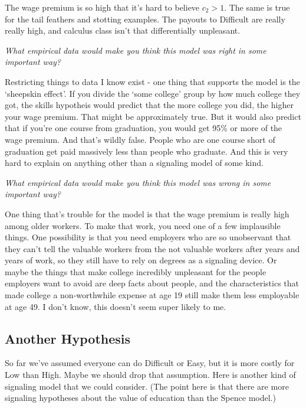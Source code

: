 \documentclass[
  11pt,
]{article}
\begin{document}
The wage premium is so high that it's hard to believe \(c_2 > 1\). The
same is true for the tail feathers and stotting examples. The payouts to
Difficult are really really high, and calculus class isn't that
differentially unpleasant.

\emph{What empirical data would make you think this model was right in
some important way?}

Restricting things to data I know exist - one thing that supports the
model is the `sheepskin effect'. If you divide the `some college' group
by how much college they got, the skills hypotheis would predict that
the more college you did, the higher your wage premium. That might be
approximately true. But it would also predict that if you're one course
from graduation, you would get 95\% or more of the wage premium. And
that's wildly false. People who are one course short of graduation get
paid massively less than people who graduate. And this is very hard to
explain on anything other than a signaling model of some kind.

\emph{What empirical data would make you think this model was wrong in
some important way?}

One thing that's trouble for the model is that the wage premium is
really high among older workers. To make that work, you need one of a
few implausible things. One possibility is that you need employers who
are so unobservant that they can't tell the valuable workers from the
not valuable workers after years and years of work, so they still have
to rely on degrees as a signaling device. Or maybe the things that make
college incredibly unpleasant for the people employers want to avoid are
deep facts about people, and the characteristics that made college a
non-worthwhile expense at age 19 still make them less employable at age
49. I don't know, this doesn't seem super likely to me.

\hypertarget{another-hypothesis}{%
\subsection{Another Hypothesis}\label{another-hypothesis}}

So far we've assumed everyone can do Difficult or Easy, but it is more
costly for Low than High. Maybe we should drop that assumption. Here is
another kind of signaling model that we could consider. (The point here
is that there are more signaling hypotheses about the value of education
than the Spence model.)
\end{document}
